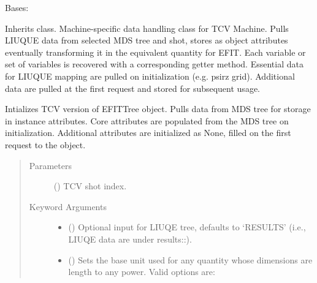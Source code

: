 \documentclass[letterpaper,10pt,english]{sphinxmanual}
\begin{document}
\begin{fulllineitems}
\label{\detokenize{eqtools:eqtools.TCVLIUQE.TCVLIUQETree}}
Bases: {\hyperref[\detokenize{eqtools:eqtools.EFIT.EFITTree}]{}}

Inherits {\hyperref[\detokenize{eqtools:eqtools.EFIT.EFITTree}]{}} class. Machine-specific data
handling class for TCV Machine. Pulls LIUQUE data from selected MDS tree
and shot, stores as object attributes eventually transforming it in the
equivalent quantity for EFIT. Each  variable or set of
variables is recovered with a corresponding getter method. Essential data
for LIUQUE mapping are pulled on initialization (e.g. psirz grid). Additional
data are pulled at the first request and stored for subsequent usage.

Intializes TCV version of EFITTree object.  Pulls data from MDS tree for
storage in instance attributes.  Core attributes are populated from the MDS
tree on initialization.  Additional attributes are initialized as None,
filled on the first request to the object.
\begin{quote}\begin{description}
\item[{Parameters}] \leavevmode
{} () \textendash{} TCV shot index.

\item[{Keyword Arguments}] \leavevmode\begin{itemize}
\item {} 
 () \textendash{} Optional input for LIUQE tree, defaults to ‘RESULTS’
(i.e., LIUQE data are under results::).

\item {} 
 () \textendash{} 
Sets the base unit used for any quantity whose
dimensions are length to any power. Valid options are:
\begin{quote}



\end{quote}
\end{itemize}
\end{description}
\end{quote}
\end{fulllineitems}
\end{document}
